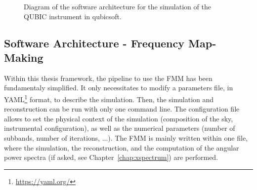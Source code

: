 \documentclass[../../thesis.tex]{subfiles}
\begin{document}
\begin{figure}[htbp]
{%
}
\caption{Diagram of the software architecture for the simulation of the QUBIC instrument in qubicsoft.}
\label{fig:diagram_qubicsoft}
\end{figure}

\subsection{Software Architecture - Frequency Map-Making}

Within this thesis framework, the pipeline to use the FMM has been fundamentaly simplified. It only necessitates to modify a parameters file, in YAML\footnote{\url{https://yaml.org/}} format, to describe the simulation. Then, the simulation and reconstruction can be run with only one command line. 
The configuration file allows to set the physical context of the simulation (composition of the sky, instrumental configuration), as well as the numerical parameters (number of subbands, number of iterations, ...). The FMM is mainly written within one file, where the simulation, the reconstruction, and the computation of the angular power spectra (if asked, see Chapter~\ref{chap:xspectrum}) are performed.
\end{document}
